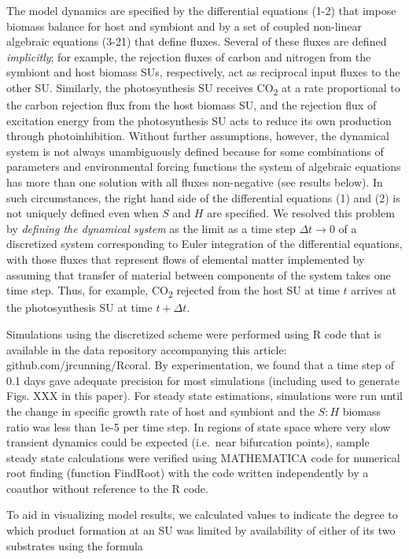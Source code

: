 \documentclass[]{elsarticle} %
\begin{document}
The model dynamics are specified by the differential equations (1-2)
that impose biomass balance for host and symbiont and by a set of
coupled non-linear algebraic equations (3-21) that define fluxes.
Several of these fluxes are defined \emph{implicitly}; for example, the
rejection fluxes of carbon and nitrogen from the symbiont and host
biomass SUs, respectively, act as reciprocal input fluxes to the other
SU. Similarly, the photosynthesis SU receives CO\textsubscript{2} at a
rate proportional to the carbon rejection flux from the host biomass SU,
and the rejection flux of excitation energy from the photosynthesis SU
acts to reduce its own production through photoinhibition. Without
further assumptions, however, the dynamical system is not always
unambiguously defined because for some combinations of parameters and
environmental forcing functions the system of algebraic equations has
more than one solution with all fluxes non-negative (see results below).
In such circumstances, the right hand side of the differential equations
(1) and (2) is not uniquely defined even when \(S\) and \(H\) are
specified. We resolved this problem by \emph{defining the dynamical
system} as the limit as a time step \(\Delta t \rightarrow 0\) of a
discretized system corresponding to Euler integration of the
differential equations, with those fluxes that represent flows of
elemental matter implemented by assuming that transfer of material
between components of the system takes one time step. Thus, for example,
CO\textsubscript{2} rejected from the host SU at time \(t\) arrives at
the photosynthesis SU at time \(t + \Delta t\).

Simulations using the discretized scheme were performed using R code
that is available in the data repository accompanying this article:
github.com/jrcunning/Rcoral. By experimentation, we found that a time
step of 0.1 days gave adequate precision for most simulations (including
used to generate Figs. XXX in this paper). For steady state estimations,
simulations were run until the change in specific growth rate of host
and symbiont and the \(S:H\) biomass ratio was less than 1e-5 per time
step. In regions of state space where very slow transient dynamics could
be expected (i.e.~near bifurcation points), sample steady state
calculations were verified using MATHEMATICA code for numerical root
finding (function FindRoot) with the code written independently by a
coauthor without reference to the R code.

To aid in visualizing model results, we calculated values to indicate
the degree to which product formation at an SU was limited by
availability of either of its two substrates using the formula
\end{document}
